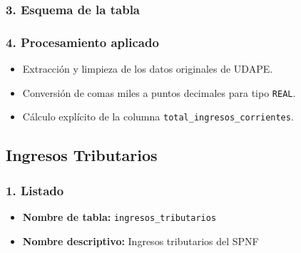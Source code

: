 \documentclass[12pt,a4paper]{article}
\begin{document}
\subsubsection*{3. Esquema de la tabla}

\subsubsection*{4. Procesamiento aplicado}
\begin{itemize}
  \item Extracción y limpieza de los datos originales de UDAPE.
  \item Conversión de comas miles a puntos decimales para tipo \texttt{REAL}.
  \item Cálculo explícito de la columna \texttt{total\_ingresos\_corrientes}.
\end{itemize}

\subsection{Ingresos Tributarios}

\subsubsection*{1. Listado}
\begin{itemize}
  \item \textbf{Nombre de tabla:} \texttt{ingresos\_tributarios}
  \item \textbf{Nombre descriptivo:} Ingresos tributarios del SPNF
\end{itemize}
\end{document}
